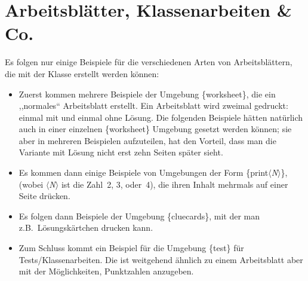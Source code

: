 \documentclass[hyperworksheet]{drcschool}
\newcommand*{\env}[1]{\textup{\ttfamily\{#1\}}}                                 %
\newcommand*{\param}[1]{\mbox{\normalfont$\langle$\textit{#1}$\rangle$}}        %
\begin{document}
\section{Arbeitsblätter, Klassenarbeiten \& Co.}
Es folgen nur einige Beispiele für die verschiedenen Arten von Arbeitsblättern, die mit
der Klasse erstellt werden können:
\begin{itemize}
\item Zuerst kommen mehrere Beispiele der Umgebung \env{worksheet}, die ein ,,normales``
      Arbeitsblatt erstellt. Ein Arbeitsblatt wird zweimal gedruckt: einmal mit und
      einmal ohne Lösung. Die folgenden Beispiele hätten natürlich auch in einer
      einzelnen \env{worksheet} Umgebung gesetzt werden können; sie aber in mehreren
      Beispielen aufzuteilen, hat den Vorteil, dass man die Variante mit Lösung nicht
      erst zehn Seiten später sieht.
\item Es kommen dann einige Beispiele von Umgebungen der Form \env{print\param{N}},
      (wobei \param{N} ist die Zahl~2, 3, oder~4), die ihren Inhalt mehrmals auf einer
      Seite drücken.
\item Es folgen dann Beispiele der Umgebung \env{cluecards}, mit der man z.B.~Lösungskärtchen drucken kann.
\item Zum Schluss kommt ein Beispiel für die Umgebung \env{test} für Tests/Klassenarbeiten.
      Die ist weitgehend ähnlich zu einem Arbeitsblatt aber mit der Möglichkeiten,
      Punktzahlen anzugeben.
\end{itemize}
\end{document}
